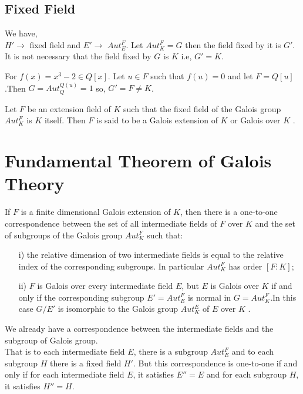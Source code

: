 \subsection{Fixed Field}
We have,\\
\(H' \rightarrow\) fixed field and \(E' \rightarrow\) \(Aut_E^F\).\hspace{5mm} Let \(Aut_K^F = G\) then the field fixed by it is \(G'\). It is not necessary that the field fixed by \(G\) is \(K\) i.e, \(G'=K\).
\begin{example}
  For \(f(x)=x^3-2 \in Q[x]\). Let \(u \in F\) such that \(f(u)=0\) and let \(F=Q[u]\).Then
  \(G=Aut_Q^{Q(u)}={1}\) so, \hspace{5mm}\(G'=F \neq K\).
\end{example}

\begin{definition}
  Let \(F\) be an extension field of \(K\) such that the fixed field of the Galois group \(Aut_K^F\) is \(K\) itself. Then \(F\) is said to be a Galois extension of \(K\) or Galois over \( K\) \cite{hunger}.
\end{definition}

\section{Fundamental Theorem of Galois Theory}
\begin{theorem}
  If \(F\) is a finite dimensional Galois extension of \(K\), then there is a one-to-one correspondence between the set of all intermediate fields of \(F\) over \(K\) and the set of subgroups of the Galois group \(Aut_K^F\) such that:
  \begin{enumerate}
  \item[i)] the relative dimension of two intermediate fields is equal to the relative index of the corresponding subgroups. In particular \(Aut_K^F\) has order \([F:K]\);
  \item[ii)] \(F\) is Galois over every intermediate field \(E\), but \(E\) is Galois over \(K\) if and only if the corresponding subgroup \(E'= Aut_E^F\) is normal in \(G=Aut_K^F\).In this case \(G/E'\) is isomorphic to the Galois group \(Aut_K^E\) of \(E\) over \(K\) \cite{hunger}.
  \end{enumerate}
\end{theorem}
We already have a correspondence between the intermediate fields and the subgroup of Galois group.\\
That is to each intermediate field \(E\), there is a subgroup \(Aut_E^F\) and to each subgroup \(H\) there is a fixed field \(H'\). But this correspondence is one-to-one if and only if for each intermediate field \(E\), it satisfies \(E''=E\) and for each subgroup \(H\), it satisfies \(H''=H\).

